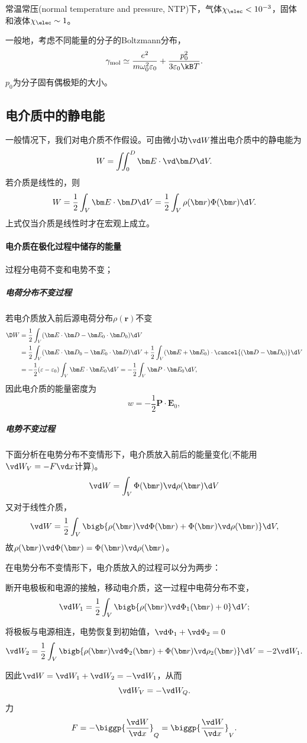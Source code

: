 \begin{example}
    {}{}
    常温常压(normal temperature and pressure, NTP)下，气体$\chi_\elec<10^{-3}$，固体和液体$\chi_\elec\sim 1$。
\end{example}

一般地，考虑不同能量的分子的Boltzmann分布，
\[
    \gamma_\text{mol}\simeq\frac{e^2}{m\omega_0^2\varepsilon_0}+\frac{p_0^2}{3\varepsilon_0\kB T}.
\]
$p_0$为分子固有偶极矩的大小。

\subsection{电介质中的静电能}
\label{ssec:electrostatic energy in dielectric media}

一般情况下，我们对电介质不作假设。可由微小功$\vd W$推出电介质中的静电能为
\[
    W=\iint_0^D\bm E\cdot\vd\bm D\d V.
\]
若介质是线性的，则
\begin{equation}
    W=\frac12\int_V\bm E\cdot\bm D\d V=\frac12\int_V\rho(\bm r)\Phi(\bm r)\d V.
\end{equation}
上式仅当介质是线性时才在宏观上成立。
\paragraph{电介质在极化过程中储存的能量}过程分电荷不变和电势不变；
\subparagraph{电荷分布不变过程}
若电介质放入前后源电荷分布$\rho(\bm r)$不变
\begin{align*}
    \D W&=\frac12\int_V(\bm E\cdot\bm D-\bm E_0\cdot\bm D_0)\d V\\
    &=\frac12\int_V(\bm E\cdot\bm D_0-\bm E_0\cdot\bm D)\d V+\frac12\int_V(\bm E+\bm E_0)\cdot\cancel{(\bm D-\bm D_0)}\d V\\
    &=-\frac12(\varepsilon-\varepsilon_0)\int_V\bm E\cdot\bm E_0\d V=-\frac12\int_V\bm P\cdot\bm E_0\d V,
\end{align*}
因此电介质的能量密度为
\begin{equation}
    w=-\frac12\bm P\cdot\bm E_0,
\end{equation}
\subparagraph{电势不变过程}下面分析在电势分布不变情形下，电介质放入前后的能量变化(不能用$\vd W_V=-F\vd x$计算)。
\[
    \vd W=\int_V\Phi(\bm r)\vd\rho(\bm r)\d V
\]
又对于线性介质，
\[
    \vd W=\frac12\int_V\bigb{\rho(\bm r)\vd\Phi(\bm r)+\Phi(\bm r)\vd\rho(\bm r)}\d V,
\]
故$\rho(\bm r)\vd\Phi(\bm r)=\Phi(\bm r)\vd\rho(\bm r)$。

在电势分布不变情形下，电介质放入的过程可以分为两步：
\begin{compactenum}
    \item 断开电极板和电源的接触，移动电介质，这一过程中电荷分布不变，
    \[
        \vd W_1=\frac12\int_V\bigb{\rho(\bm r)\vd\Phi_1(\bm r)+0}\d V;
    \]
    \item 将极板与电源相连，电势恢复到初始值，$\vd\Phi_1+\vd\Phi_2=0$
    \[
        \vd W_2=\frac12\int_V\bigb{\rho(\bm r)\vd\Phi_2(\bm r)+\Phi(\bm r)\vd\rho_2(\bm r)}\d V=-2\vd W_1.
    \]
\end{compactenum}
因此$\vd W=\vd W_1+\vd W_2=-\vd W_1$，从而
\[
    \vd W_V=-\vd W_Q.
\]
力
\[
    F=-\biggp{\frac{\vd W}{\vd x}}_Q=\biggp{\frac{\vd W}{\vd x}}_V.
\]

